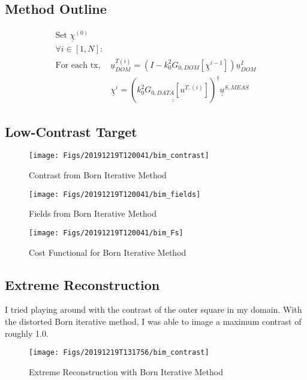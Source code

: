 \documentclass[final,titlepage,onecolumn]{article}
\begin{document}
\FloatBarrier
\subsection{Method Outline}
\begin{align*}
\text{Set } \underline{\chi}^{(0)}&\\
\forall i \in \left[1,N\right]:&\\
\text{For each tx, }&\underline{u}^{T(i)}_{DOM} = \left(I-k_0^2G_{0,DOM}\left[\underline{\chi}^{i-1}\right]\right)\underline{u}^{I}_{DOM}\\
&\underline{\chi}^{i} = \left(\underline{\underline{k_0^2G_{0,DATA}\left[u^{T,(i)}\right]}}\right)^{\dagger}\underline{\underline{u}}^{S,MEAS}
\end{align*}

\FloatBarrier
\subsection{Low-Contrast Target}
\begin{figure}[h]
	\centering
	\texttt{[image: Figs/20191219T120041/bim\_contrast]}
	\caption[bim_contrast]{Contrast from Born Iterative Method}
	\label{fig:bimcontrast}
\end{figure}
\begin{figure}[h]
	\centering
	\texttt{[image: Figs/20191219T120041/bim\_fields]}
	\caption[bim_fields]{Fields from Born Iterative Method}
	\label{fig:bimfields}
\end{figure}
\begin{figure}[h]
	\centering
	\texttt{[image: Figs/20191219T120041/bim\_Fs]}
	\caption[bim_fs]{Cost Functional for Born Iterative Method}
	\label{fig:bimfs}
\end{figure}


\FloatBarrier
\subsection{Extreme Reconstruction}
I tried playing around with the contrast of the outer square in my domain. With the distorted Born iterative method, I was able to image a maximum contrast of roughly 1.0.
\begin{figure}[h]
	\centering
	\texttt{[image: Figs/20191219T131756/bim\_contrast]}
	\caption[bim_extreme]{Extreme Reconstruction with Born Iterative Method}
	\label{fig:bimextreme}
\end{figure}
\end{document}

